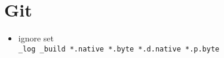 \section{Git}
\begin{itemize}
\item ignore set \\
  \verb|_log _build *.native *.byte *.d.native *.p.byte|
\end{itemize}
